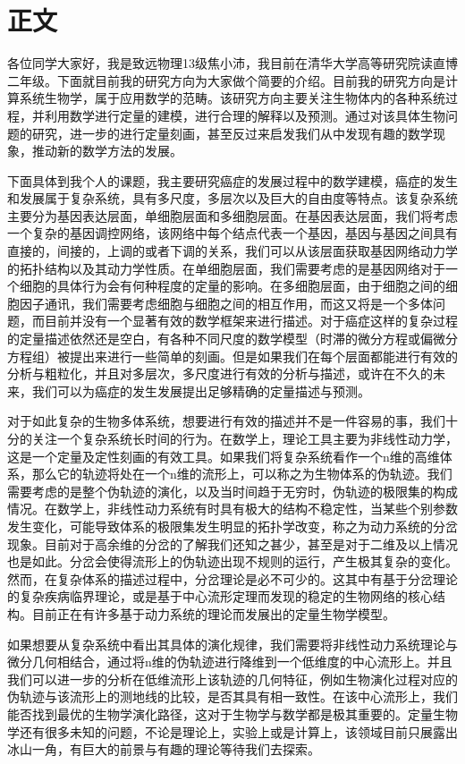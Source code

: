 

\section{正文}
各位同学大家好，我是致远物理13级焦小沛，我目前在清华大学高等研究院读直博二年级。下面就目前我的研究方向为大家做个简要的介绍。目前我的研究方向是计算系统生物学，属于应用数学的范畴。该研究方向主要关注生物体内的各种系统过程，并利用数学进行定量的建模，进行合理的解释以及预测。通过对该具体生物问题的研究，进一步的进行定量刻画，甚至反过来启发我们从中发现有趣的数学现象，推动新的数学方法的发展。

下面具体到我个人的课题，我主要研究癌症的发展过程中的数学建模，癌症的发生和发展属于复杂系统，具有多尺度，多层次以及巨大的自由度等特点。该复杂系统主要分为基因表达层面，单细胞层面和多细胞层面。在基因表达层面，我们将考虑一个复杂的基因调控网络，该网络中每个结点代表一个基因，基因与基因之间具有直接的，间接的，上调的或者下调的关系，我们可以从该层面获取基因网络动力学的拓扑结构以及其动力学性质。在单细胞层面，我们需要考虑的是基因网络对于一个细胞的具体行为会有何种程度的定量的影响。在多细胞层面，由于细胞之间的细胞因子通讯，我们需要考虑细胞与细胞之间的相互作用，而这又将是一个多体问题，而目前并没有一个显著有效的数学框架来进行描述。对于癌症这样的复杂过程的定量描述依然还是空白，有各种不同尺度的数学模型（时滞的微分方程或偏微分方程组）被提出来进行一些简单的刻画。但是如果我们在每个层面都能进行有效的分析与粗粒化，并且对多层次，多尺度进行有效的分析与描述，或许在不久的未来，我们可以为癌症的发生发展提出足够精确的定量描述与预测。


对于如此复杂的生物多体系统，想要进行有效的描述并不是一件容易的事，我们十分的关注一个复杂系统长时间的行为。在数学上，理论工具主要为非线性动力学，这是一个定量及定性刻画的有效工具。如果我们将复杂系统看作一个n维的高维体系，那么它的轨迹将处在一个n维的流形上，可以称之为生物体系的伪轨迹。我们需要考虑的是整个伪轨迹的演化，以及当时间趋于无穷时，伪轨迹的极限集的构成情况。在数学上，非线性动力系统有时具有极大的结构不稳定性，当某些个别参数发生变化，可能导致体系的极限集发生明显的拓扑学改变，称之为动力系统的分岔现象。目前对于高余维的分岔的了解我们还知之甚少，甚至是对于二维及以上情况也是如此。分岔会使得流形上的伪轨迹出现不规则的运行，产生极其复杂的变化。然而，在复杂体系的描述过程中，分岔理论是必不可少的。这其中有基于分岔理论的复杂疾病临界理论\cite{1}，或是基于中心流形定理而发现的稳定的生物网络的核心结构\cite{2}。目前正在有许多基于动力系统的理论而发展出的定量生物学模型。


如果想要从复杂系统中看出其具体的演化规律，我们需要将非线性动力系统理论与微分几何相结合，通过将n维的伪轨迹进行降维到一个低维度的中心流形上。并且我们可以进一步的分析在低维流形上该轨迹的几何特征，例如生物演化过程对应的伪轨迹与该流形上的测地线的比较，是否其具有相一致性。在该中心流形上，我们能否找到最优的生物学演化路径，这对于生物学与数学都是极其重要的。定量生物学还有很多未知的问题，不论是理论上，实验上或是计算上，该领域目前只展露出冰山一角，有巨大的前景与有趣的理论等待我们去探索。
